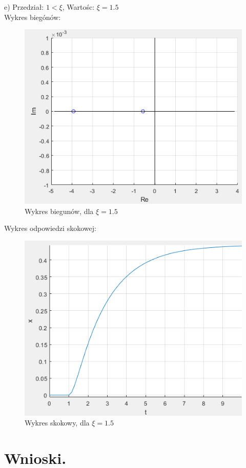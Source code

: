 \documentclass{article}
\begin{document}
\begin{flushleft}
 
 \newpage
 
 
 e) Przedział: $1<\xi$, Wartośc: $\xi=1.5$\\
  Wykres biegónów:\\
 \begin{figure}[h!]
    \centering
    \includegraphics[scale=0.6]{biegunykis1,5.png}
    \caption{Wykres biegunów, dla $\xi=1.5$}
    \label{fig:bieguny_ksi_1_5}
 \end{figure}
 
 
 Wykres odpowiedzi skokowej:\\
 \begin{figure}[h!]
    \centering
    \includegraphics[scale=0.6]{skokksi1_5.png}
    \caption{Wykres skokowy, dla $\xi=1.5$}
    \label{fig:ksi_1_5}
 \end{figure}
\end{flushleft}
 \newpage
\section{Wnioski.}
\end{document}
